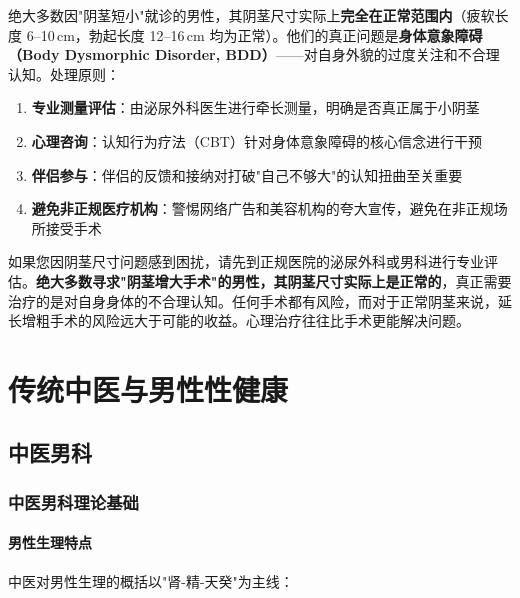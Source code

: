 \documentclass[12pt,a4paper,twoside]{ctexbook}
\begin{document}
绝大多数因"阴茎短小"就诊的男性，其阴茎尺寸实际上\textbf{完全在正常范围内}（疲软长度 6--10\,cm，勃起长度 12--16\,cm 均为正常）。他们的真正问题是\textbf{身体意象障碍（Body Dysmorphic Disorder, BDD）}——对自身外貌的过度关注和不合理认知。处理原则：
\begin{enumerate}
	\item \textbf{专业测量评估}：由泌尿外科医生进行牵长测量，明确是否真正属于小阴茎
	\item \textbf{心理咨询}：认知行为疗法（CBT）针对身体意象障碍的核心信念进行干预
	\item \textbf{伴侣参与}：伴侣的反馈和接纳对打破"自己不够大"的认知扭曲至关重要
	\item \textbf{避免非正规医疗机构}：警惕网络广告和美容机构的夸大宣传，避免在非正规场所接受手术
\end{enumerate}

\begin{tcolorbox}[colback=pink!5!white,colframe=red!50!black,title=贴心小叮咛]
如果您因阴茎尺寸问题感到困扰，请先到正规医院的泌尿外科或男科进行专业评估。\textbf{绝大多数寻求"阴茎增大手术"的男性，其阴茎尺寸实际上是正常的}，真正需要治疗的是对自身身体的不合理认知。任何手术都有风险，而对于正常阴茎来说，延长增粗手术的风险远大于可能的收益。心理治疗往往比手术更能解决问题。
\end{tcolorbox}



\part{传统中医与男性性健康}

\chapter{中医男科}

\section{中医男科理论基础}


\subsection{男性生理特点}


中医对男性生理的概括以"肾-精-天癸"为主线：
\end{document}
